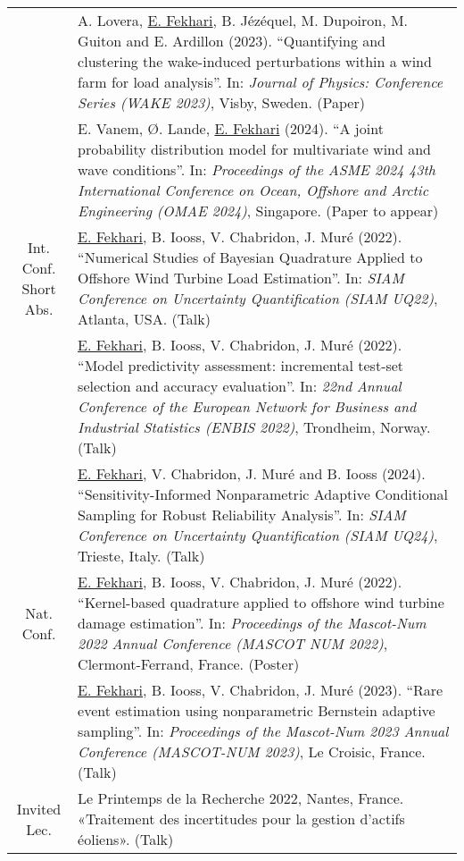 \begin{center}
\begin{tabularx}{\textwidth}{c X}
                    & A. Lovera, \underline{E. Fekhari}, B. Jézéquel, M. Dupoiron, M. Guiton and E. Ardillon (2023). 
                    ``Quantifying and clustering the wake-induced perturbations within a wind farm for load analysis''. 
                    In: \textit{Journal of Physics: Conference Series (WAKE 2023)}, Visby, Sweden. (Paper)\\
                    
                    & E. Vanem, \O{}. Lande, \underline{E. Fekhari} (2024). 
                    ``A joint probability distribution model for multivariate wind and wave conditions''.
                    In: \textit{Proceedings of the ASME 2024 43th International Conference on Ocean, Offshore and Arctic Engineering (OMAE 2024)}, Singapore. (Paper to appear)\\
        \hline
\shortstack{Int. Conf.\\Short Abs.}  & \underline{E. Fekhari}, B. Iooss, V. Chabridon, J. Muré (2022).
                    ``Numerical Studies of Bayesian Quadrature Applied to Offshore Wind Turbine Load Estimation''.
                    In: \textit{SIAM Conference on Uncertainty Quantification (SIAM UQ22)}, Atlanta, USA. (Talk)\\
        
                    & \underline{E. Fekhari}, B. Iooss, V. Chabridon, J. Muré (2022). 
                    ``Model predictivity assessment: incremental test-set selection and accuracy evaluation''.
                    In: \textit{22nd Annual Conference of the European Network for Business and Industrial Statistics (ENBIS 2022)}, Trondheim, Norway. (Talk)\\

                    & \underline{E. Fekhari}, V. Chabridon, J. Muré and B. Iooss (2024). 
                    ``Sensitivity-Informed Nonparametric Adaptive Conditional Sampling for Robust Reliability Analysis''. 
                    In: \textit{SIAM Conference on Uncertainty Quantification (SIAM UQ24)}, Trieste, Italy. (Talk)\\
        \hline
        Nat. Conf.  & \underline{E. Fekhari}, B. Iooss, V. Chabridon, J. Muré (2022).
                    ``Kernel-based quadrature applied to offshore wind turbine damage estimation''. 
                    In: \textit{Proceedings of the Mascot-Num 2022 Annual Conference (MASCOT NUM 2022)}, Clermont-Ferrand, France. (Poster)\\
        
                    & \underline{E. Fekhari}, B. Iooss, V. Chabridon, J. Muré (2023).
                    ``Rare event estimation using nonparametric Bernstein adaptive sampling''. 
                    In: \textit{Proceedings of the Mascot-Num 2023 Annual Conference (MASCOT-NUM 2023)}, Le Croisic, France. (Talk)\\
        \hline
        Invited Lec.& Le Printemps de la Recherche 2022, Nantes, France. «Traitement des incertitudes pour la gestion d’actifs éoliens». (Talk)\\


\end{tabularx}
\end{center}
